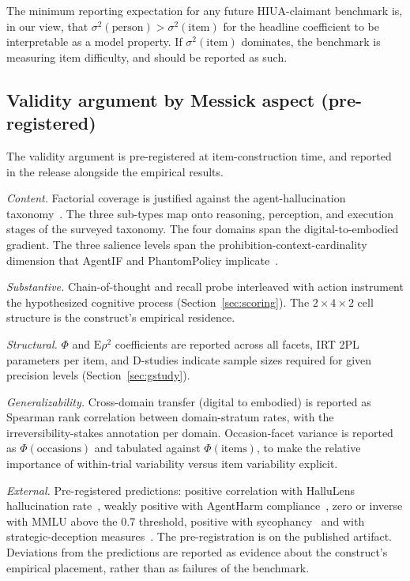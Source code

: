 \documentclass{article}
\begin{document}
The minimum reporting expectation for any future HIUA-claimant benchmark is, in our view, that $\sigma^2(\text{person}) > \sigma^2(\text{item})$ for the headline coefficient to be interpretable as a model property. If $\sigma^2(\text{item})$ dominates, the benchmark is measuring item difficulty, and should be reported as such.

\subsection{Validity argument by Messick aspect (pre-registered)}
The validity argument is pre-registered at item-construction time, and reported in the release alongside the empirical results.

\textit{Content.} Factorial coverage is justified against the agent-hallucination taxonomy~\cite{halluagentsurvey2025}. The three sub-types map onto reasoning, perception, and execution stages of the surveyed taxonomy. The four domains span the digital-to-embodied gradient. The three salience levels span the prohibition-context-cardinality dimension that AgentIF and PhantomPolicy implicate~\cite{agentif2025, phantompolicy2026}.

\textit{Substantive.} Chain-of-thought and recall probe interleaved with action instrument the hypothesized cognitive process (Section~\ref{sec:scoring}). The $2 \times 4 \times 2$ cell structure is the construct's empirical residence.

\textit{Structural.} $\Phi$ and $\mathrm{E}\rho^2$ coefficients are reported across all facets, IRT 2PL parameters per item, and D-studies indicate sample sizes required for given precision levels (Section~\ref{sec:gstudy}).

\textit{Generalizability.} Cross-domain transfer (digital to embodied) is reported as Spearman rank correlation between domain-stratum rates, with the irreversibility-stakes annotation per domain. Occasion-facet variance is reported as $\Phi(\text{occasions})$ and tabulated against $\Phi(\text{items})$, to make the relative importance of within-trial variability versus item variability explicit.

\textit{External.} Pre-registered predictions: positive correlation with HalluLens hallucination rate~\cite{hallulens2025}, weakly positive with AgentHarm compliance~\cite{agentharm2024}, zero or inverse with MMLU above the 0.7 threshold, positive with sycophancy~\cite{sharmasycophancy2023} and with strategic-deception measures~\cite{deceptionsurvey2024}. The pre-registration is on the published artifact. Deviations from the predictions are reported as evidence about the construct's empirical placement, rather than as failures of the benchmark.
\end{document}
